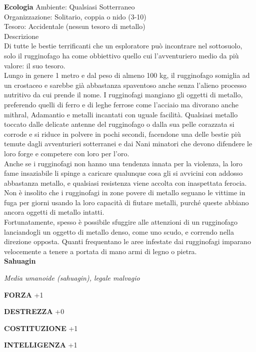 \begin{multicols}{2}
\textbf{Ecologia}
Ambiente: Qualsiasi Sotterraneo\\
Organizzazione: Solitario, coppia o nido (3-10)\\
Tesoro: Accidentale (nessun tesoro di metallo)\\
Descrizione\\
Di tutte le bestie terrificanti che un esploratore può incontrare nel sottosuolo, solo il rugginofago ha come obbiettivo quello cui l'avventuriero medio da più valore: il suo tesoro.\\
Lungo in genere 1 metro e dal peso di almeno 100 kg, il rugginofago somiglia ad un crostaceo e sarebbe già abbastanza spaventoso anche senza l'alieno processo nutritivo da cui prende il nome. I rugginofagi mangiano gli oggetti di metallo, preferendo quelli di ferro e di leghe ferrose come l'acciaio ma divorano anche mithral, Adamantio e metalli incantati con uguale facilità. Qualsiasi metallo toccato dalle delicate antenne del rugginofago o dalla sua pelle corazzata si corrode e si riduce in polvere in pochi secondi, facendone una delle bestie più temute dagli avventurieri sotterranei e dai Nani minatori che devono difendere le loro forge e competere con loro per l'oro.\\
Anche se i rugginofagi non hanno una tendenza innata per la violenza, la loro fame insaziabile li spinge a caricare qualunque cosa gli si avvicini con addosso abbastanza metallo, e qualsiasi resistenza viene accolta con inaspettata ferocia. Non è insolito che i rugginofagi in zone povere di metallo seguano le vittime in fuga per giorni usando la loro capacità di fiutare metalli, purché queste abbiano ancora oggetti di metallo intatti.\\
Fortunatamente, spesso è possibile sfuggire alle attenzioni di un rugginofago lanciandogli un oggetto di metallo denso, come uno scudo, e correndo nella direzione opposta. Quanti frequentano le aree infestate dai rugginofagi imparano velocemente a tenere a portata di mano armi di legno o pietra.\\



\medskip{}\textbf{Sahuagin}

\emph{Media umanoide (sahuagin), legale malvagio}

\textbf{FORZA} +1

\textbf{DESTREZZA} +0

\textbf{COSTITUZIONE} +1

\textbf{INTELLIGENZA} +1


\end{multicols}
